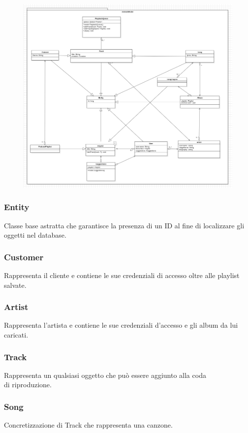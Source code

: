 \documentclass{article}
\begin{document}
\begin{figure}[H]
\includegraphics[scale=0.4]{model01}
\end{figure}

\subsubsection{Entity}
Classe base astratta che garantisce la presenza di un ID al fine di localizzare gli oggetti nel database.
\subsubsection{Customer}
Rappresenta il cliente e contiene le sue credenziali di accesso oltre alle playlist salvate. 
\subsubsection{Artist}
Rappresenta l'artista e contiene le sue credenziali d'accesso e gli album da lui caricati.
\subsubsection{Track}
Rappresenta un qualsiasi oggetto che può essere aggiunto alla coda\\ di riproduzione.
\subsubsection{Song}
Concretizzazione di Track che rappresenta una canzone.
\end{document}
